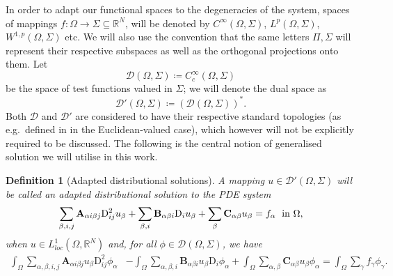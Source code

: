 \documentclass{amsart}
\numberwithin{equation}{section}
\numberwithin{thm}{section}
\newtheorem{definition}[thm]{Definition}
\theoremstyle{definition}
\renewcommand{\:}{\!:\!} %
\renewcommand{\^}[1]{^{#1}_{\phantom{l}}}
\begin{document}
In order to adapt our functional spaces to the degeneracies of the system, spaces of mappings $f : \Omega \longrightarrow \Sigma \subseteq \mathbb{R}^N$, will be denoted by $C^\infty(\Omega, \Sigma)$, $L^p(\Omega, \Sigma)$, $W^{1, p}(\Omega, \Sigma)$ etc.  We will also use the convention that the same letters $\Pi, \Sigma$ will represent their respective subspaces as well as the orthogonal projections onto them. Let 
\begin{equation*}
\mathscr{D}(\Omega, \Sigma) \coloneqq C^\infty_c(\Omega, \Sigma)
\end{equation*}
be the space of test functions valued in $\Sigma$; we will denote the dual space as 
 \begin{equation*}
\mathscr{D}'(\Omega, \Sigma) \coloneqq (\mathscr{D}(\Omega, \Sigma))^*.
\end{equation*}
Both $\mathscr{D}$ and $\mathscr{D}'$ are considered to have their respective standard topologies (as e.g.\ defined in \cite{folland1} in the Euclidean-valued case), which however will not be explicitly required to be discussed. The following is the central notion of generalised solution we will utilise in this work.

\begin{definition}[Adapted distributional solutions]
A mapping $u \in \mathscr{D}'(\Omega, \Sigma)$ will be called an \emph{adapted distributional solution} to the PDE system
\begin{equation*}
\sum_{\beta, i, j} \mathbf{A}_{\alpha i \beta j}\mathrm{D}_{ij}^{2}u_{\beta} + \sum_{\beta, i} \mathbf{B}_{\alpha \beta i}\mathrm{D}_{i}u_{\beta} + \sum_{\beta} \mathbf{C}_{\alpha \beta}u_{\beta} = f_{\alpha} \hspace{0.1cm} \text{ in $\Omega$},
\end{equation*}
when $u \in L^1_{loc}(\Omega, \mathbb{R}^N)$ and, for all $\phi \in \mathscr{D}(\Omega, \Sigma)$, we have
\[
\begin{split}
\int_{\Omega} \sum_{\alpha, \beta, i, j} \mathbf{A}_{\alpha i \beta j} u_{\beta}  \mathrm{D}^2_{ij}\phi_{\alpha} &- \int_{\Omega} \sum_{\alpha, \beta, i} \mathbf{B}_{\alpha \beta i} u_{\beta}\mathrm{D}_{i}\phi_{\alpha} 
+  \int_{\Omega} \sum_{\alpha, \beta} \mathbf{C}_{\alpha \beta}u_{\beta}\phi_{\alpha} = \int_{\Omega} \sum_{\gamma} f_{\gamma} \phi_{\gamma}.
\end{split}
\] 
\end{definition}
\end{document}
